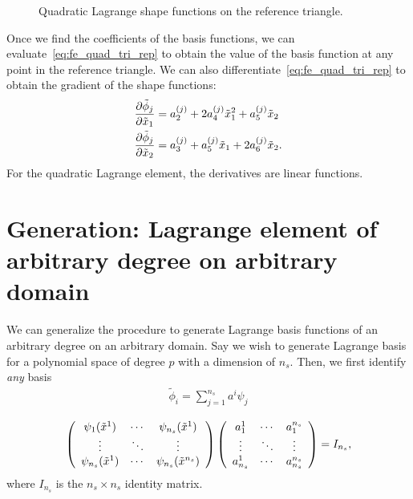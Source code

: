 \begin{figure}
  \centering
  \caption{Quadratic Lagrange shape functions on the reference triangle.}
  \label{fig:fe_shape_tri_p2}
\end{figure}

Once we find the coefficients of the basis functions, we can evaluate~\eqref{eq:fe_quad_tri_rep} to obtain the value of the basis function at any point in the reference triangle.  We can also differentiate~\eqref{eq:fe_quad_tri_rep} to obtain the gradient of the shape functions:
\begin{align*}
  \pp{\tilde \phi_j}{\tilde x_1} &= a^{(j)}_2 + 2 a^{(j)}_4 \tilde x^2_1 + a^{(j)}_5 \tilde x_2
  \\
  \pp{\tilde \phi_j}{\tilde x_2} &= a^{(j)}_3 + a^{(j)}_5 \tilde x_1 + 2 a^{(j)}_6 \tilde x_2.
\end{align*}
For the quadratic Lagrange element, the derivatives are linear functions.

\section{Generation: Lagrange element of arbitrary degree on arbitrary domain}
We can generalize the procedure to generate Lagrange basis functions of an arbitrary degree on an arbitrary domain.  Say we wish to generate Lagrange basis for a polynomial space of degree $p$ with a dimension of $n_s$.  Then, we first identify \emph{any} basis 
\begin{align*}
  \tilde \phi_i = \sum_{j=1}^{n_s} a^i \psi_j
\end{align*}

\begin{align*}
  \bmat{ccc}
  \psi_1(\tilde x^1) & \cdots & \psi_{n_s}(\tilde x^1) \\
  \vdots & \ddots & \vdots \\
  \psi_{n_s}(\tilde x^1) & \cdots & \psi_{n_s}(\tilde x^{n_s}) 
  \emat
  \bmat{ccc}
  a^1_1 & \cdots & a^{n_s}_1 \\
  \vdots & \ddots & \vdots \\
  a^1_{n_s} & \cdots & a^{n_s}_{n_s}
  \emat
  =
  I_{n_s},
\end{align*}
where $I_{n_s}$ is the $n_s \times n_s$ identity matrix.

